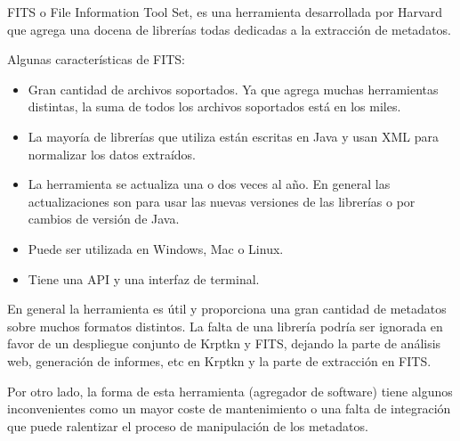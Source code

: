FITS o File Information Tool Set, es una herramienta desarrollada por Harvard que agrega una docena de librerías todas dedicadas a la extracción de metadatos.

Algunas características de FITS:

\begin{itemize}
  \item Gran cantidad de archivos soportados. Ya que agrega muchas herramientas distintas, la suma de todos los archivos soportados está en los miles.
  \item La mayoría de librerías que utiliza están escritas en Java y usan XML para normalizar los datos extraídos.
  \item La herramienta se actualiza una o dos veces al año. En general las actualizaciones son para usar las nuevas versiones de las librerías o por cambios de versión de Java.
  \item Puede ser utilizada en Windows, Mac o Linux.
  \item Tiene una API y una interfaz de terminal.
\end{itemize}

En general la herramienta es útil y proporciona una gran cantidad de metadatos sobre muchos formatos distintos. La falta de una librería podría ser ignorada en favor de un despliegue conjunto de Krptkn y FITS, dejando la parte de análisis web, generación de informes, etc en Krptkn y la parte de extracción en FITS.

Por otro lado, la forma de esta herramienta (agregador de software) tiene algunos inconvenientes como un mayor coste de mantenimiento o una falta de integración que puede ralentizar el proceso de manipulación de los metadatos.